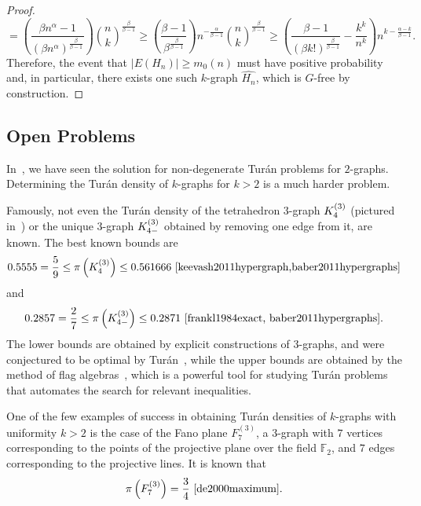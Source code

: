 \begin{proposition}
\begin{proof}
\[            = \left( \frac{\beta n^{\alpha} - 1}{\left( \beta n^{\alpha} \right)^\frac{\beta}{\beta-1}} \right) \binom{n}{k}^{\frac{\beta}{\beta-1}}
            \geq \left( \frac{\beta - 1}{\beta^{\frac{\beta}{\beta - 1}}} \right) n^{- \frac{\alpha}{\beta - 1}} \binom{n}{k}^{\frac{\beta}{\beta - 1}}
            \geq \left( \frac{\beta - 1}{(\beta k!)^{\frac{\beta}{\beta - 1}}}  - \frac{k^k}{n^k} \right) n^{k - \frac{\alpha - k}{\beta - 1}}.
        \]
        Therefore, the event that $|E(H_n)| \geq m_0(n)$
        must have positive probability and, in particular,
        there exists one such $k$-graph $\widehat{H_n}$, which is $G$-free by construction.
    \end{proof}
\end{proposition}

\subsection{Open Problems}\label{subsec:open-problems} %

In~, we have
seen the solution for non-degenerate Turán problems for $2$-graphs.
Determining the Turán density of $k$-graphs for $k > 2$ is a much harder problem.

Famously, not even the Turán density of the tetrahedron $3$-graph $K^{(3)}_{4}$
(pictured in~) or the unique $3$-graph $K^{(3)}_{4-}$
obtained by removing one edge from it, are known.
The best known bounds are
\[
    0.5555 = \frac{5}{9}
    \leq \pi\left(\completesuperindex{3}{4}\right)
    \leq 0.561666~\cite{keevash2011hypergraph,baber2011hypergraphs} %
\]
and
\[
     0.2857 = \frac{2}{7}
     \leq \pi\left(K^{(3)}_{4-}\right)
     \leq 0.2871~\cite{frankl1984exact, baber2011hypergraphs}.
\]
The lower bounds are obtained by explicit constructions of $3$-graphs,
and were conjectured to be optimal by Turán~\cite{keevash2011hypergraph},
while the upper bounds are obtained by the method of flag algebras~\cite{razborov2007flag},
which is a powerful tool for studying Turán problems that automates the search for relevant inequalities.

One of the few examples of success in obtaining Turán densities of $k$-graphs with uniformity $k > 2$ is the case of
the Fano plane $F^{(3)}_7$, a $3$-graph with $7$ vertices corresponding to the points
of the projective plane over the field $\mathbb{F}_2$,
and $7$ edges corresponding to the projective lines.
It is known that
\[
    \pi\left(F^{(3)}_7\right) = \frac{3}{4}~\cite{de2000maximum}.
\]

